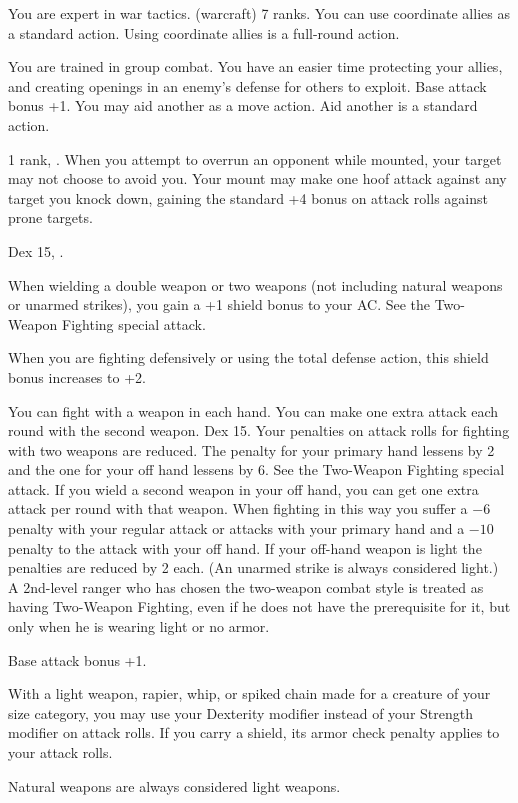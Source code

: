 {You are expert in war tactics.}
{ (warcraft) 7 ranks.}
{You can use coordinate allies as a standard action.}
{Using coordinate allies is a full-round action.}{}

{You are trained in group combat. You have an easier time protecting your allies, and creating openings in an enemy's defense for others to exploit.}
{Base attack bonus +1.}
{You may aid another as a move action.}
{Aid another is a standard action.}{}

{ 1 rank, .}
{When you attempt to overrun an opponent while mounted, your target may not choose to avoid you. Your mount may make one hoof attack against any target you knock down, gaining the standard +4 bonus on attack rolls against prone targets.}

{Dex 15, .}
{When wielding a double weapon or two weapons (not including natural weapons or unarmed strikes), you gain a +1 shield bonus to your AC. See the Two-Weapon Fighting special attack.

When you are fighting defensively or using the total defense action, this shield bonus increases to +2.}

{You can fight with a weapon in each hand. You can make one extra attack each round with the second weapon.}
{Dex 15.}
{Your penalties on attack rolls for fighting with two weapons are reduced. The penalty for your primary hand lessens by 2 and the one for your off hand lessens by 6. See the Two-Weapon Fighting special attack.}
{If you wield a second weapon in your off hand, you can get one extra attack per round with that weapon. When fighting in this way you suffer a $-6$ penalty with your regular attack or attacks with your primary hand and a $-10$ penalty to the attack with your off hand. If your off-hand weapon is light the penalties are reduced by 2 each. (An unarmed strike is always considered light.)}
{A 2nd-level ranger who has chosen the two-weapon combat style is treated as having Two-Weapon Fighting, even if he does not have the prerequisite for it, but only when he is wearing light or no armor.}

{Base attack bonus +1.}
{With a light weapon, rapier, whip, or spiked chain made for a creature of your size category, you may use your Dexterity modifier instead of your Strength modifier on attack rolls. If you carry a shield, its armor check penalty applies to your attack rolls.

Natural weapons are always considered light weapons.}


